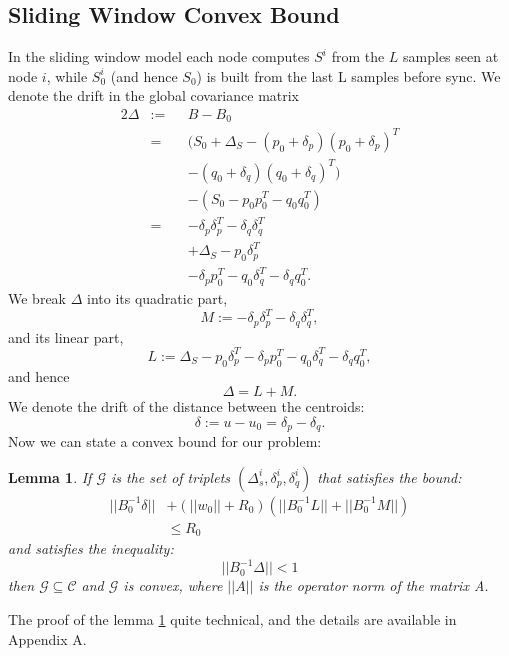 \documentclass[11pt,twocolumn,varwidth=true,a4paper,fleqn]{article}
\newtheorem{lemma}{Lemma}
\begin{document}
\subsection{Sliding Window Convex Bound}
In the sliding window model each node computes $S^i$ from the $L$ samples seen
at node $i$, while $S_0^i$ (and hence $S_0$) is built from the last L samples before
sync. 
We denote the drift in the global covariance matrix
\begin{alignat*}{2}
\Delta & := && B-B_0 \\
& = && (S_0+\Delta_S - (p_0+\delta_p)(p_0+\delta_p)^T \\
& && - (q_0+\delta_q)(q_0+\delta_q)^T) \\
& && - (S_0 - p_0p_0^T - q_0q_0^T) \\
& = && - \delta_p\delta_p^T - \delta_q\delta_q^T \\
& && + \Delta_S - p_0\delta_p^T \\
& && - \delta_pp_0^T - q_0\delta_q^T - \delta_qq_0^T.
\end{alignat*}
We break $\Delta$ into its quadratic part,
\begin{equation*}
M:= - \delta_p\delta_p^T - \delta_q\delta_q^T, 
\end{equation*}
and its linear part,
\begin{equation*}
L:= \Delta_S - p_0\delta_p^T - \delta_pp_0^T - q_0\delta_q^T - \delta_qq_0^T, 
\end{equation*}
and hence 
\begin{equation*}
\Delta= L+ M.
\end{equation*}
We denote the drift of the distance between the centroids:
\begin{equation*}
\delta:= u-u_0 = \delta_p - \delta_q.
\end{equation*}
Now we can state a convex bound for our problem:
\begin{lemma} \label{convexBound}
If $\mathcal{G}$ is the set of triplets $(\Delta_s^i, \delta_p^i, \delta_q^i)$
 that satisfies the bound:
 \begin{equation*} \label{eq:convexBound}
\begin{split}
||B_0^{-1}\delta|| &+ (||w_0||+R_0)(||B_0^{-1}L||+||B_0^{-1}M||) \\ & \leq  R_0
\end{split}
\end{equation*}
and satisfies the inequality:
 \begin{equation*} 
||B_0^{-1}\Delta|| < 1
\end{equation*}
 then $\mathcal{G}
 \subseteq \mathcal{C}$ and $\mathcal{G}$ is convex, where $||A||$ is the
 operator norm of the matrix A.
\end{lemma}
The proof of the lemma \ref{convexBound} quite technical, and
the details are available in Appendix A.
\end{document}
